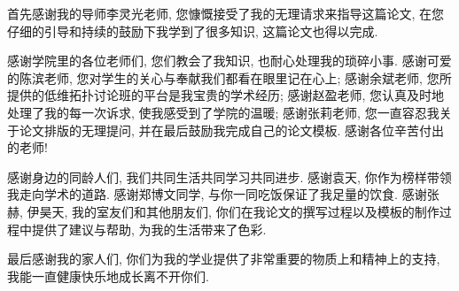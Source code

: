 
\begin{acknowledgements}
  首先感谢我的导师李灵光老师, 您慷慨接受了我的无理请求来指导这篇论文, 在您仔细的引导和持续的鼓励下我学到了很多知识, 这篇论文也得以完成.

  感谢学院里的各位老师们, 您们教会了我知识, 也耐心处理我的琐碎小事. 感谢可爱的陈滨老师, 您对学生的关心与奉献我们都看在眼里记在心上; 感谢余斌老师, 您所提供的低维拓扑讨论班的平台是我宝贵的学术经历; 感谢赵盈老师, 您认真及时地处理了我的每一次诉求, 使我感受到了学院的温暖; 感谢张莉老师, 您一直容忍我关于论文排版的无理提问, 并在最后鼓励我完成自己的论文模板. 感谢各位辛苦付出的老师!

  感谢身边的同龄人们, 我们共同生活共同学习共同进步. 感谢袁天, 你作为榜样带领我走向学术的道路. 感谢郑博文同学, 与你一同吃饭保证了我足量的饮食. 感谢张赫, 伊昊天, 我的室友们和其他朋友们, 你们在我论文的撰写过程以及模板的制作过程中提供了建议与帮助, 为我的生活带来了色彩.

  最后感谢我的家人们, 你们为我的学业提供了非常重要的物质上和精神上的支持, 我能一直健康快乐地成长离不开你们.
%
\end{acknowledgements}

